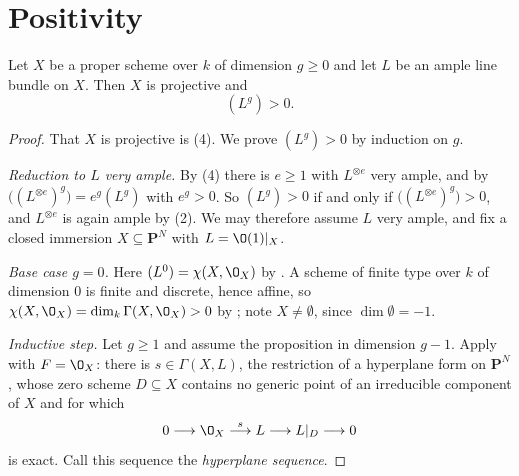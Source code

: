 \section{Positivity}\label{sec:deg-positivity}

\begin{proposition}
\label{prop:deg-ample-positive}
Let $X$ be a proper scheme over $k$ of dimension $g\geq0$ and let $L$ be an
ample line bundle on $X$.  Then $X$ is projective and
\[
  (L^g)>0 .
\]
\end{proposition}
\begin{proof}
That $X$ is projective is (4).  We prove
$(L^g)>0$ by induction on $g$.

\emph{Reduction to $L$ very ample.}  By (4) there is
$e\geq1$ with $L^{\otimes e}$ very ample, and by
$\bigl((L^{\otimes e})^g\bigr)=e^g(L^g)$ with $e^g>0$.  So $(L^g)>0$ if and
only if $\bigl((L^{\otimes e})^g\bigr)>0$, and $L^{\otimes e}$ is again ample
by (2).  We may therefore assume $L$ very ample, and
fix a closed immersion $X\subseteq\mathbf P^N$ with $L=\O(1)|_X$.

\emph{Base case $g=0$.}  Here $(L^0)=\chi(X,\O_X)$ by
.  A scheme of finite type over $k$ of dimension
$0$ is finite and discrete, hence affine, so
$\chi(X,\O_X)=\dim_k\Gamma(X,\O_X)>0$ by ; note
$X\neq\emptyset$, since $\dim\emptyset=-1$.

\emph{Inductive step.}  Let $g\geq1$ and assume the proposition in dimension
$g-1$.  Apply  with $F=\O_X$: there is
$s\in\Gamma(X,L)$, the restriction of a hyperplane form on $\mathbf P^N$, whose
zero scheme $D\subseteq X$ contains no generic point of an irreducible
component of $X$ and for which
\[
  0\longrightarrow\O_X\stackrel{s}{\longrightarrow}L
  \longrightarrow L|_D\longrightarrow0
\]
is exact.  Call this sequence the \emph{hyperplane sequence}.


\end{proof}
